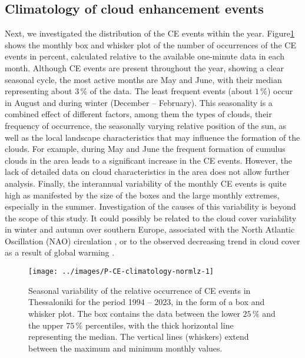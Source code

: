 \documentclass[preprint, 5p,
authoryear]{elsarticle} %
\begin{document}
\hypertarget{climatology-of-cloud-enhancement-events}{%
\subsection{Climatology of cloud enhancement
events}\label{climatology-of-cloud-enhancement-events}}

Next, we investigated the distribution of the CE events within the year.
Figure\nobreakspace{}\ref{fig:relative-month-occurrences} shows the
monthly box and whisker plot of the number of occurrences of the CE
events in percent, calculated relative to the available one-minute data
in each month. Although CE events are present throughout the year,
showing a clear seasonal cycle, the most active months are May and June,
with their median representing about \(3\,\%\) of the data. The least
frequent events (about \(1\,\%\)) occur in August and during winter
(December -- February). This seasonality is a combined effect of
different factors, among them the types of clouds, their frequency of
occurrence, the seasonally varying relative position of the sun, as well
as the local landscape characteristics that may influence the formation
of the clouds. For example, during May and June the frequent formation
of cumulus clouds in the area leads to a significant increase in the CE
events. However, the lack of detailed data on cloud characteristics in
the area does not allow further analysis. Finally, the interannual
variability of the monthly CE events is quite high as manifested by the
size of the boxes and the large monthly extremes, especially in the
summer. Investigation of the causes of this variability is beyond the
scope of this study. It could possibly be related to the cloud cover
variability in winter and autumn over southern Europe, associated with
the North Atlantic Oscillation (NAO) circulation \citep{Chiacchio2010},
or to the observed decreasing trend in cloud cover as a result of global
warming \citep[e.g.,][]{SanchezLorenzo2017}.

\begin{figure}

{\centering \texttt{[image: ../images/P-CE-climatology-normlz-1]} 

}

\caption{Seasonal variability of the relative occurrence of CE events in Thessaloniki for the period 1994 -- 2023, in the form of a box and whisker plot. The box contains the data between the lower $25\,\%$ and the upper $75\,\%$ percentiles, with the thick horizontal line representing the median. The vertical lines (whiskers) extend between the maximum and minimum monthly values.}\label{fig:relative-month-occurrences}
\end{figure}
\end{document}

